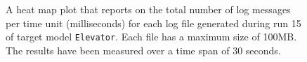 \begin{figure}[htbp]
\centering
\begin{minipage}{1\textwidth}
  \centering
\end{minipage}
\caption{A heat map plot that reports on the total number of log messages per time unit (milliseconds) for each log file generated during run 15 of target model \texttt{Elevator}. Each file has a maximum size of 100MB. The results have been measured over a time span of 30 seconds.}
\label{figure:throughput_sum_elevator_15}
\end{figure}